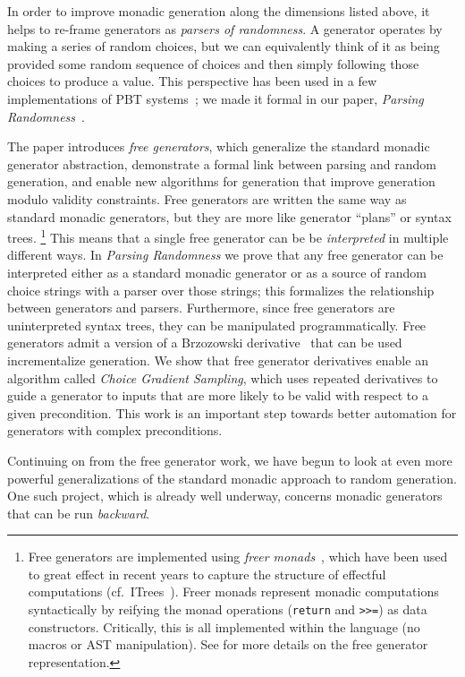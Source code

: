 In order to improve monadic generation along the dimensions listed
above, it helps to re-frame generators as {\em parsers of randomness}. A generator
operates by making a series of random choices, but we can equivalently think of
it as being provided some random sequence of choices and then simply following
those choices to produce a value. This perspective has been used in a few
implementations of PBT
systems~\cite{maciver2019hypothesis, dolan2017testing}; we made it
formal in our paper, {\em Parsing Randomness}~\cite{goldstein2022parsing}.

The paper introduces {\em free generators}, which generalize the standard
monadic generator abstraction, demonstrate a formal link between parsing and
random generation, and enable new algorithms for generation that improve
generation modulo validity constraints. Free generators are written the same
way as standard monadic generators, but they are more like generator ``plans''
or syntax trees.%
\footnote{Free generators are implemented using {\em freer
monads}~\cite{kiselyov2015freer}, which have been used to great effect in recent
years to capture the structure of effectful computations
(cf.~ITrees~\cite{old:xia2019interaction}). Freer monads represent
monadic computations syntactically by reifying the monad operations
(\lstinline{return} and \lstinline{>>=}) as data constructors. Critically, this
is all implemented within the language (no macros or AST
manipulation). See \cite{goldstein2022parsing} for more details on the
free generator representation.}
This means that a single free generator can be be {\em interpreted} in multiple
different ways. In {\em Parsing Randomness} we prove that any free generator can
be interpreted either as a standard monadic generator or as a source of
random choice strings with a parser over those strings; this formalizes the
relationship between generators and parsers. Furthermore, since free generators
are uninterpreted syntax trees, they can be manipulated programmatically. Free
generators admit a version of a Brzozowski
derivative~\cite{brzozowski1964derivatives} that can be used incrementalize
generation. We show that free generator derivatives enable an algorithm called
{\em Choice Gradient Sampling}, which uses repeated derivatives to guide a
generator to inputs that are more likely to be valid with respect to a given
precondition. This work is an important step towards better automation for
generators with complex preconditions.

Continuing on from the free generator work, we have begun to look at even more
powerful generalizations of the standard monadic approach to random generation.
One such project, which is already well underway, concerns monadic generators
that can be run {\em backward}.

